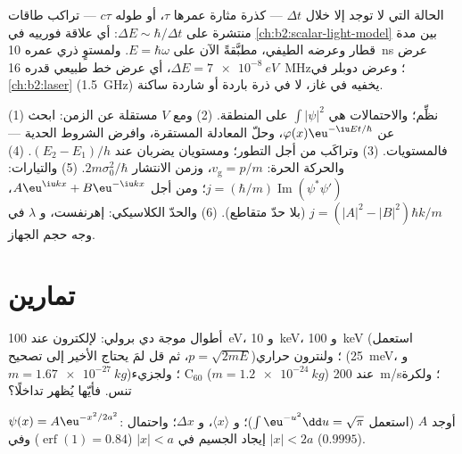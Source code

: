 \begin{remark}\label{rem:b2:schrodinger-wave-functions:energytime}
الحالة التي لا توجد إلا خلال $\Delta t$ --- كذرة مثارة عمرها
$\tau$، أو  طوله $c\tau$ --- تراكب طاقات
منتشرة على $\Delta E \sim \hbar/\Delta t$: أي علاقة فورييه في
\cref{ch:b2:scalar-light-model} بين مدة قطار وعرضه
الطيفي، مطبَّقةً الآن على $E = \hbar\omega$. ولمستوٍ ذري
عمره \qty{10}{ns} عرض $\Delta E = \qty{7e-8}{eV}$، أي عرض خط طبيعي
قدره \qty{16}{MHz}؛ وعرض دوبلر في \cref{ch:b2:laser}
(\qty{1.5}{GHz}) يخفيه في غاز، لا في ذرة باردة أو شاردة
ساكنة.
\end{remark}

\begin{method}\label{meth:b2:schrodinger-wave-functions:method}
(1) نظِّم؛ والاحتمالات هي $\int|\psi|^2$ على المنطقة. (2)
ومع $V$ مستقلة عن الزمن: ابحث عن $\varphi(x)\eu^{-\iu Et/\hbar}$، وحلّ
المعادلة المستقرة، وافرض الشروط الحدية --- فالمستويات.
(3) وتراكَب  من أجل التطور؛ ومستويان يضربان عند
$(E_2 - E_1)/h$. (4) والحركة الحرة: $v_{\text{g}} = p/m$، وزمن الانتشار
$2m\sigma_0^2/\hbar$. (5) والتيارات: $j = (\hbar/m)\operatorname{Im}(\psi^*\psi')$؛
ومن أجل $A\eu^{\iu kx} + B\eu^{-\iu kx}$، $j = (|A|^2 - |B|^2)\hbar k/m$ (بلا حدّ متقاطع).
(6) والحدّ الكلاسيكي: إهرنفست، و $\lambda$ في وجه حجم
الجهاز.
\end{method}

\section{تمارين}

\begin{exercise}[$\star$]\label{exo:b2:schrodinger-wave-functions:1}
أطوال موجة دي برولي: لإلكترون عند \qty{100}{eV}، و \qty{10}{keV}،
و \qty{100}{keV} (استعمل $p = \sqrt{2mE}$، ثم قل لمَ يحتاج الأخير إلى
تصحيح)؛ ولنترون حراري (\qty{25}{meV}، و $m = \qty{1.67e-27}{kg}$)؛ ولجزيء
C$_{60}$ ($m = \qty{1.2e-24}{kg}$) عند \qty{200}{m/s}؛ ولكرة
تنس. فأيّها يُظهر تداخلًا؟
\end{exercise}

\begin{exercise}[$\star$]\label{exo:b2:schrodinger-wave-functions:2}
$\psi(x) = A\eu^{-x^2/2a^2}$: أوجد $A$ (استعمل $\int\eu^{-u^2}\dd u = \sqrt\pi$)؛
و $\langle x\rangle$، و $\Delta x$؛ واحتمال إيجاد الجسيم في
$|x| < a$ ($\operatorname{erf}(1) = 0.84$) وفي $|x| < 2a$ ($0.9995$).
\end{exercise}

